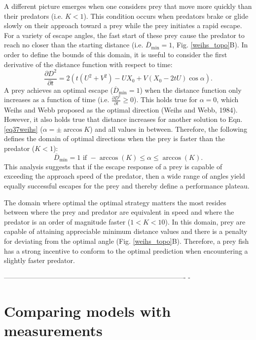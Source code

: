 \documentclass[12pt]{article}
\def\d{\partial}
\newcommand{\ol}{\overline}
\begin{document}
A different picture emerges when one considers prey that move more quickly than
their predators (i.e. $K<1$). This condition occurs when predators brake or
glide slowly on their approach toward a prey \citep{Higham:2007go,
Higham:2005iu} while the prey initiates a rapid escape. For a variety of escape
angles, the fast start of these prey cause the predator to reach no closer than
the starting distance (i.e. $\ol D_{\text{min}}=1$, Fig. \ref{weihs_topo}B). In
order to define the bounds of this domain, it is useful to consider the first
derivative of the distance function with respect to time:
%
\begin{equation}
\frac{\d D^2}{\d t}= 2(t(U^2+V^2) - UX_0 + V(X_0-2tU)\cos\alpha).
\label{distderivative}
\end{equation}  
%
A prey achieves an optimal escape ($\ol D_{\text{min}}=1$) when the distance
function only increases as a function of time (i.e. $\frac{\d D^2}{\d
t}\geq0$). This holds true for $\alpha=0$, which Weihs and Webb proposed as the
optimal direction (Weihs and Webb, 1984). However, it also holds true that
distance increases for another solution to Eqn. \ref{eq37weihs} ($\alpha= \pm
\arccos K$) and all values in between. Therefore, the following defines the
domain of optimal directions when the prey is faster than the predator
($K<1$):
%
\begin{equation}
\ol D_{\text{min}}=1 \text{ if } -\arccos(K) \leq \alpha \leq \arccos(K).
\label{anglerange}
\end{equation}
%
This analysis suggests that if the escape response of a prey is capable of
exceeding the approach speed of the predator, then a wide range of angles yield
equally successful escapes for the prey and thereby define a performance
plateau. 

The domain where optimal the optimal strategy matters the most resides between
where the prey and predator are equivalent in speed and where the predator is
an order of magnitude faster ($1<K<10$). In this domain, prey are capable of
attaining appreciable minimum distance values and there is a penalty for
deviating from the optimal angle (Fig. \ref{weihs_topo}B). Therefore, a prey
fish has a strong incentive to conform to the optimal prediction when
encountering a slightly faster predator.

%
-------------------------------------------------------------------------------
-
\section{Comparing models with measurements}
\end{document}
